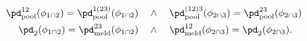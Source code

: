 \begin{align}
  \pd_{\text{pool}}^{12}(\phi_{1 \cap 2}) = \pd_{\text{pool}}^{1(23)}(\phi_{1 \cap 2}) \quad &\land \quad
  \pd_{\text{pool}}^{(12)3}(\phi_{2 \cap 3}) = \pd_{\text{pool}}^{23}(\phi_{2 \cap 3}) 
  \label{eqn:orig-melding-commutative-equalities-1}
  \\
  \pd_{2}(\phi_{1 \cap 2}) = \pd_{\text{meld}}^{23}(\phi_{1 \cap 2}) \quad &\land \quad
  \pd_{\text{meld}}^{12}(\phi_{2 \cap 3}) = \pd_{2}(\phi_{2 \cap 3}).
  \label{eqn:orig-melding-commutative-equalities-2}
\end{align}